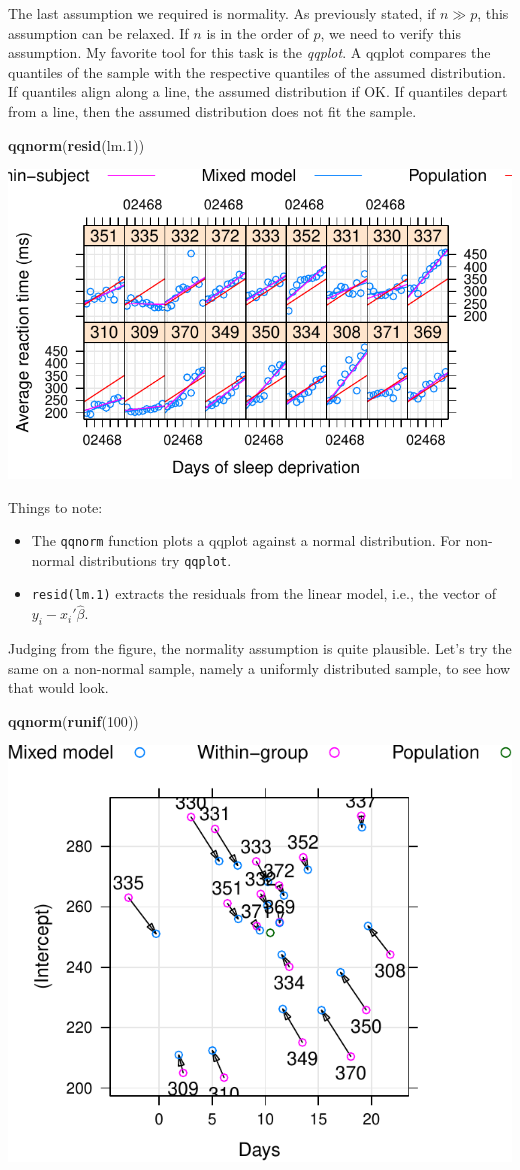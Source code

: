 \documentclass[]{book}
\newenvironment{Shaded}{\begin{snugshade}}{\end{snugshade}}
\newcommand{\KeywordTok}[1]{\textcolor[rgb]{0.13,0.29,0.53}{\textbf{#1}}}
\newcommand{\DecValTok}[1]{\textcolor[rgb]{0.00,0.00,0.81}{#1}}
\newcommand{\NormalTok}[1]{#1}
\providecommand{\tightlist}{%
  \setlength{\itemsep}{0pt}\setlength{\parskip}{0pt}}
\theoremstyle{definition}
\theoremstyle{definition}
\theoremstyle{definition}
\theoremstyle{remark}
\begin{document}
The last assumption we required is normality. As previously stated, if
\(n \gg p\), this assumption can be relaxed. If \(n\) is in the order of
\(p\), we need to verify this assumption. My favorite tool for this task
is the \emph{qqplot}. A qqplot compares the quantiles of the sample with
the respective quantiles of the assumed distribution. If quantiles align
along a line, the assumed distribution if OK. If quantiles depart from a
line, then the assumed distribution does not fit the sample.

\begin{Shaded}
\begin{Highlighting}[]
\KeywordTok{qqnorm}\NormalTok{(}\KeywordTok{resid}\NormalTok{(lm.}\DecValTok{1}\NormalTok{))}
\end{Highlighting}
\end{Shaded}

\includegraphics[width=0.5\linewidth]{Rcourse_files/figure-latex/unnamed-chunk-163-1}

Things to note:

\begin{itemize}
\tightlist
\item
  The \texttt{qqnorm} function plots a qqplot against a normal
  distribution. For non-normal distributions try \texttt{qqplot}.
\item
  \texttt{resid(lm.1)} extracts the residuals from the linear model,
  i.e., the vector of \(y_i-x_i'\hat \beta\).
\end{itemize}

Judging from the figure, the normality assumption is quite plausible.
Let's try the same on a non-normal sample, namely a uniformly
distributed sample, to see how that would look.

\begin{Shaded}
\begin{Highlighting}[]
\KeywordTok{qqnorm}\NormalTok{(}\KeywordTok{runif}\NormalTok{(}\DecValTok{100}\NormalTok{))}
\end{Highlighting}
\end{Shaded}

\includegraphics[width=0.5\linewidth]{Rcourse_files/figure-latex/unnamed-chunk-164-1}
\end{document}
